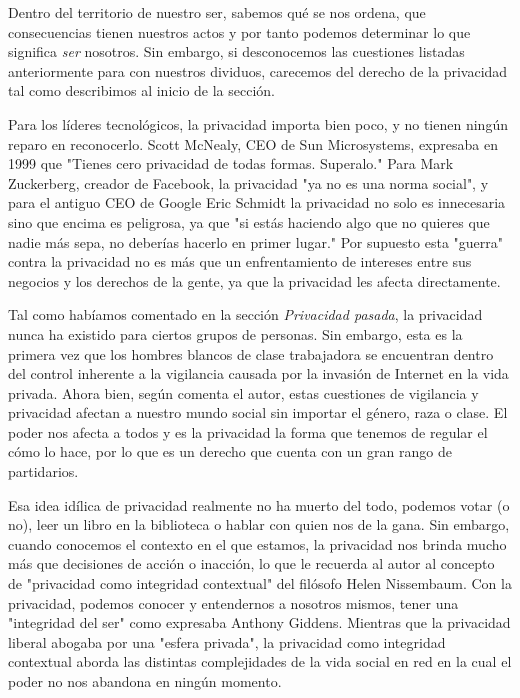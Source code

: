 \documentclass[11pt]{article}
\begin{document}
Dentro del territorio de nuestro ser, sabemos qué se nos ordena, que consecuencias tienen nuestros actos y por tanto podemos determinar lo que significa \textit{ser} nosotros. Sin embargo, si desconocemos las cuestiones listadas anteriormente para con nuestros dividuos, carecemos del derecho de la privacidad tal como describimos al inicio de la sección.

Para los líderes tecnológicos, la privacidad importa bien poco, y no tienen ningún reparo en reconocerlo. Scott McNealy, CEO de Sun Microsystems, expresaba en 1999 que "Tienes cero privacidad de todas formas. Superalo." Para Mark Zuckerberg, creador de Facebook, la privacidad "ya no es una norma social", y para el antiguo CEO de Google Eric Schmidt la privacidad no solo es innecesaria sino que encima es peligrosa, ya que "si estás haciendo algo que no quieres que nadie más sepa, no deberías hacerlo en primer lugar." Por supuesto esta "guerra" contra la privacidad no es más que un enfrentamiento de intereses entre sus negocios y los derechos de la gente, ya que la privacidad les afecta directamente.

Tal como habíamos comentado en la sección \textit{Privacidad pasada}, la privacidad nunca ha existido para ciertos grupos de personas. Sin embargo, esta es la primera vez que los hombres blancos de clase trabajadora se encuentran dentro del control inherente a la vigilancia causada por la invasión de Internet en la vida privada. Ahora bien, según comenta el autor, estas cuestiones de vigilancia y privacidad afectan a nuestro mundo social sin importar el género, raza o clase. El poder nos afecta a todos y es la privacidad la forma que tenemos de regular el cómo lo hace, por lo que es un derecho que cuenta con un gran rango de partidarios.

Esa idea idílica de privacidad realmente no ha muerto del todo, podemos votar (o no), leer un libro en la biblioteca o hablar con quien nos de la gana. Sin embargo, cuando conocemos el contexto en el que estamos, la privacidad nos brinda mucho más que decisiones de acción o inacción, lo que le recuerda al autor al concepto de "privacidad como integridad contextual" del filósofo Helen Nissembaum. Con la privacidad, podemos conocer y entendernos a nosotros mismos, tener una "integridad del ser" como expresaba Anthony Giddens. Mientras que la privacidad liberal abogaba por una "esfera privada", la privacidad como integridad contextual aborda las distintas complejidades de la vida social en red en la cual el poder no nos abandona en ningún momento.
\end{document}
